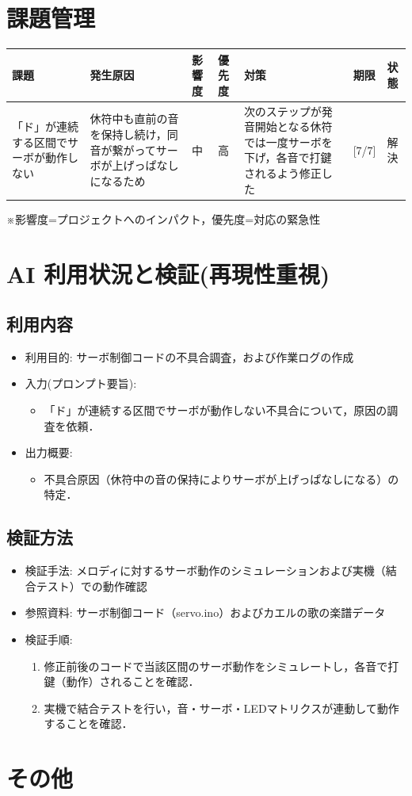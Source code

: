 \documentclass[uplatex,dvipdfmx]{jlreq}
\begin{document}
\section{課題管理}
\begin{table}[H]
    \centering
    \small
    \begin{tabular}{p{3cm}p{3cm}llp{3cm}ll}
        \toprule
        課題 & 発生原因 & 影響度 & 優先度 & 対策 & 期限 & 状態 \\
        \midrule
        「ド」が連続する区間でサーボが動作しない & 休符中も直前の音を保持し続け，同音が繋がってサーボが上げっぱなしになるため & 中 & 高 & 次のステップが発音開始となる休符では一度サーボを下げ，各音で打鍵されるよう修正した & [7/7] & 解決 \\
        \bottomrule
    \end{tabular}
\end{table}
\vspace{0.5em}
\noindent ※影響度=プロジェクトへのインパクト，優先度=対応の緊急性

\section{AI 利用状況と検証(再現性重視)}
\subsection{利用内容}
\begin{itemize}
    \item 利用目的: サーボ制御コードの不具合調査，および作業ログの作成
    \item  入力(プロンプト要旨):
    \begin{itemize}
        \item 「ド」が連続する区間でサーボが動作しない不具合について，原因の調査を依頼．
    \end{itemize}
    \item  出力概要:
    \begin{itemize}
        \item 不具合原因（休符中の音の保持によりサーボが上げっぱなしになる）の特定．
    \end{itemize}
\end{itemize}

\subsection{検証方法}
\begin{itemize}
    \item  検証手法: メロディに対するサーボ動作のシミュレーションおよび実機（結合テスト）での動作確認
    \item  参照資料: サーボ制御コード（servo.ino）およびカエルの歌の楽譜データ
    \item  検証手順:
    \begin{enumerate}
        \item 修正前後のコードで当該区間のサーボ動作をシミュレートし，各音で打鍵（動作）されることを確認．
        \item 実機で結合テストを行い，音・サーボ・LEDマトリクスが連動して動作することを確認．
    \end{enumerate}
\end{itemize}

\section{その他}
\end{document}

